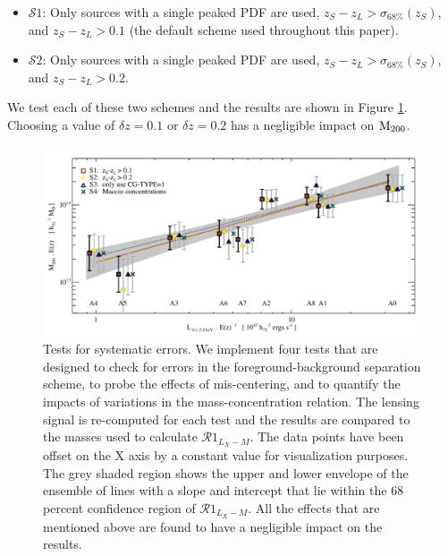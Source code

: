 \documentclass[12pt]{emulateapj}
\begin{document}
\begin{itemize}
\item $\mathcal{S}1$: Only sources with a single peaked PDF are used,
  $z_S-z_L> \sigma_{68\%}(z_S)$, and $z_S-z_L> 0.1$ (the default
  scheme used throughout this paper).
\item $\mathcal{S}2$: Only sources with a single peaked PDF are used,
  $z_S-z_L> \sigma_{68\%}(z_S)$, and $z_S-z_L> 0.2$.
\end{itemize}

We test each of these two schemes and the results are shown in Figure
\ref{systematics}. Choosing a value of $\delta z=0.1$ or $\delta
z=0.2$ has a negligible impact on $\rm{M}_{\rm 200}$.

\begin{figure}[htb]
\centerline{\includegraphics[scale=0.47]{figure7.pdf}}
\caption{Tests for systematic errors. We implement four tests that are
  designed to check for errors in the foreground-background separation
  scheme, to probe the effects of mis-centering, and to quantify the
  impacts of variations in the mass-concentration relation. The
  lensing signal is re-computed for each test and the results are
  compared to the masses used to calculate
  $\mathcal{R}1_{L_{X}-M}$. The data points have been offset on the X
  axis by a constant value for visualization purposes. The grey shaded
  region shows the upper and lower envelope of the ensemble of lines
  with a slope and intercept that lie within the 68 percent confidence
  region of $\mathcal{R}1_{L_{X}-M}$. All the effects that are
  mentioned above are found to have a negligible impact on the
  results.}
\label{systematics}
\end{figure}
\end{document}
